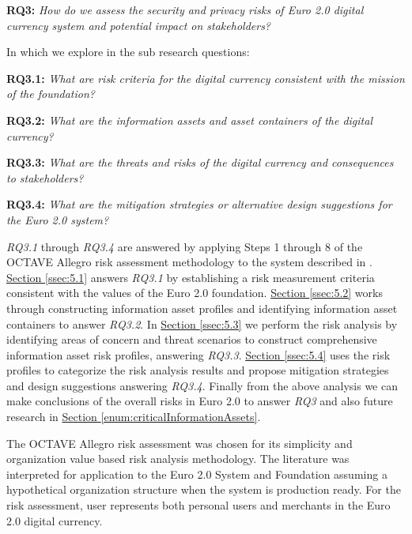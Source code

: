 \documentclass[12pt]{article} %
\newcommand{\hypernameref}[1]{\hyperref[#1]{\nameref{#1}}}
\newcommand{\hypersectionref}[1]{\hyperref[#1]{Section \ref{#1}}}
\begin{document}
{\begin{quoting}
	\textbf{RQ3:} \textit{How do we assess the security and privacy risks of Euro 2.0 digital currency system and potential impact on stakeholders?}
\end{quoting}

In which we explore in the sub research questions:
\begin{quoting}
	\textbf{RQ3.1: }\textit{What are risk criteria for the digital currency consistent with the mission of the foundation?}
\end{quoting}
\begin{quoting}
	\textbf{RQ3.2: }\textit{What are the information assets and asset containers of the digital currency?}
\end{quoting}
\begin{quoting}
	\textbf{RQ3.3: }\textit{What are the threats and risks of the digital currency and consequences to stakeholders?}
\end{quoting}
\begin{quoting}
	\textbf{RQ3.4: }\textit{What are the mitigation strategies or alternative design suggestions for the Euro 2.0 system?}
\end{quoting}

\textit{RQ3.1} through \textit{RQ3.4} are answered by applying Steps 1 through 8 of the OCTAVE Allegro risk assessment methodology\cite{CaralliIntroducingOCTAVE2007} to the system described in \hypernameref{sec:3}. \hypersectionref{ssec:5.1} answers \textit{RQ3.1} by establishing a risk measurement criteria consistent with the values of the Euro 2.0 foundation. \hypersectionref{ssec:5.2} works through constructing information asset profiles and identifying information asset containers to answer \textit{RQ3.2}. In \hypersectionref{ssec:5.3} we perform the risk analysis by identifying areas of concern and threat scenarios to construct comprehensive information asset risk profiles, answering \textit{RQ3.3}. \hypersectionref{ssec:5.4} uses the risk profiles to categorize the risk analysis results and propose mitigation strategies and design suggestions answering \textit{RQ3.4}. Finally from the above analysis we can make conclusions of the overall risks in Euro 2.0 to answer \textit{RQ3} and also future research in \hypersectionref{enum:criticalInformationAssets}.

The OCTAVE Allegro risk assessment was chosen for its simplicity and organization value based risk analysis methodology. The literature was interpreted for application to the Euro 2.0 System and Foundation assuming a hypothetical organization structure when the system is production ready. For the risk assessment, user represents both personal users and merchants in the Euro 2.0 digital currency.

}
\end{document}
